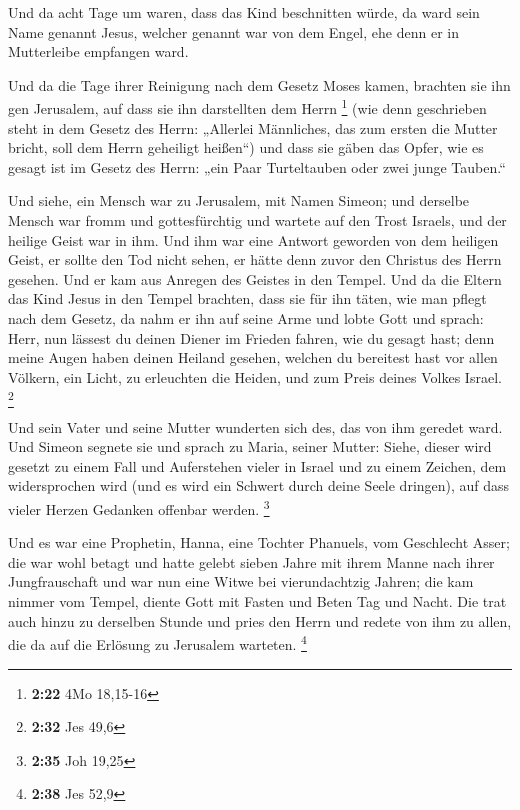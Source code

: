 Und da acht Tage um waren, dass das Kind beschnitten
würde, da ward sein Name genannt Jesus, welcher genannt war von dem
Engel, ehe denn er in Mutterleibe empfangen ward.

 Und da die Tage ihrer Reinigung nach dem Gesetz Moses
kamen, brachten sie ihn gen Jerusalem, auf dass sie ihn darstellten dem
Herrn \footnote{\textbf{2:22} 4Mo 18,15-16}  (wie denn
geschrieben steht in dem Gesetz des Herrn: „Allerlei Männliches, das zum
ersten die Mutter bricht, soll dem Herrn geheiligt heißen``)
 und dass sie gäben das Opfer, wie es gesagt ist im
Gesetz des Herrn: „ein Paar Turteltauben oder zwei junge Tauben.``

 Und siehe, ein Mensch war zu Jerusalem, mit Namen
Simeon; und derselbe Mensch war fromm und gottesfürchtig und wartete auf
den Trost Israels, und der heilige Geist war in ihm.  Und
ihm war eine Antwort geworden von dem heiligen Geist, er sollte den Tod
nicht sehen, er hätte denn zuvor den Christus des Herrn gesehen.
 Und er kam aus Anregen des Geistes in den Tempel. Und da
die Eltern das Kind Jesus in den Tempel brachten, dass sie für ihn
täten, wie man pflegt nach dem Gesetz,  da nahm er ihn
auf seine Arme und lobte Gott und sprach:  Herr, nun
lässest du deinen Diener im Frieden fahren, wie du gesagt hast;
 denn meine Augen haben deinen Heiland gesehen,
 welchen du bereitest hast vor allen Völkern,
 ein Licht, zu erleuchten die Heiden, und zum Preis
deines Volkes Israel. \footnote{\textbf{2:32} Jes 49,6}

 Und sein Vater und seine Mutter wunderten sich des, das
von ihm geredet ward.  Und Simeon segnete sie und sprach
zu Maria, seiner Mutter: Siehe, dieser wird gesetzt zu einem Fall und
Auferstehen vieler in Israel und zu einem Zeichen, dem widersprochen
wird  (und es wird ein Schwert durch deine Seele
dringen), auf dass vieler Herzen Gedanken offenbar werden. \footnote{\textbf{2:35}
  Joh 19,25}

 Und es war eine Prophetin, Hanna, eine Tochter Phanuels,
vom Geschlecht Asser; die war wohl betagt und hatte gelebt sieben Jahre
mit ihrem Manne nach ihrer Jungfrauschaft  und war nun
eine Witwe bei vierundachtzig Jahren; die kam nimmer vom Tempel, diente
Gott mit Fasten und Beten Tag und Nacht.  Die trat auch
hinzu zu derselben Stunde und pries den Herrn und redete von ihm zu
allen, die da auf die Erlösung zu Jerusalem warteten. \footnote{\textbf{2:38}
  Jes 52,9}

